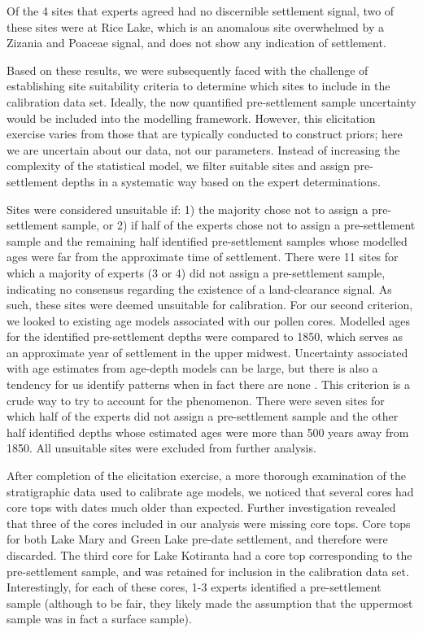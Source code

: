 \documentclass[12pt]{article}
\begin{document}
Of the 4 sites that experts agreed had no discernible settlement
signal, two of these sites were at Rice Lake, which is an anomalous
site overwhelmed by a Zizania and Poaceae signal, and does not show
any indication of settlement. 

Based on these results, we were subsequently faced with the challenge
of establishing site suitability criteria to determine which sites to
include in the calibration data set. Ideally, the now quantified
pre-settlement sample uncertainty would be included into the modelling
framework. However, this elicitation exercise varies from those that
are typically conducted to construct priors; here we are uncertain
about our data, not our parameters. Instead of increasing the
complexity of the statistical model, we filter suitable sites and
assign pre-settlement depths in a systematic way based on the expert
determinations.

Sites were considered unsuitable if: 1) the majority chose not to
assign a pre-settlement sample, or 2) if half of the experts chose not
to assign a pre-settlement sample and the remaining half identified
pre-settlement samples whose modelled ages were far from the
approximate time of settlement. There were 11 sites for which a
majority of experts (3 or 4) did not assign a pre-settlement sample,
indicating no consensus regarding the existence of a land-clearance
signal. As such, these sites were deemed unsuitable for
calibration. For our second criterion, we looked to existing age
models associated with our pollen cores. Modelled ages for the
identified pre-settlement depths were compared to 1850, which serves
as an approximate year of settlement in the upper midwest. Uncertainty
associated with age estimates from age-depth models can be large, but
there is also a tendency for us identify patterns when in fact there
are none \cite{XXX}. This criterion is a crude way to try to account
for the phenomenon.  There were seven sites for which half of the
experts did not assign a pre-settlement sample and the other half
identified depths whose estimated ages were more than 500 years away from
1850. All unsuitable sites were excluded from further analysis.

After completion of the elicitation exercise, a more thorough
examination of the stratigraphic data used to calibrate age models, we
noticed that several cores had core tops with dates much older than
expected. Further investigation revealed that three of the cores
included in our analysis were missing core tops. Core tops for both
Lake Mary and Green Lake pre-date settlement, and therefore were
discarded. The third core for Lake Kotiranta had a core top
corresponding to the pre-settlement sample, and was retained for
inclusion in the calibration data set. Interestingly, for each of
these cores, 1-3 experts identified a pre-settlement sample (although
to be fair, they likely made the assumption that the uppermost sample
was in fact a surface sample). 
\end{document}
